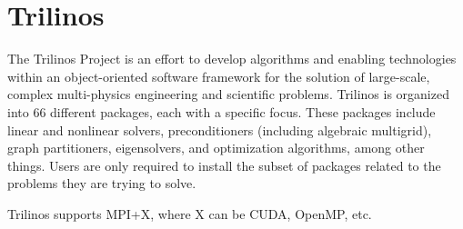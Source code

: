 \section{Trilinos}
The Trilinos Project is an effort to develop algorithms and enabling
technologies within an object-oriented software framework for the solution of
large-scale, complex multi-physics engineering and scientific problems. Trilinos
is organized into 66 different packages, each with a specific focus.  These
packages include linear and nonlinear solvers, preconditioners (including
algebraic multigrid), graph partitioners, eigensolvers, and optimization
algorithms, among other things.  Users are only required to install the subset
of packages related to the problems they are trying to solve.

Trilinos supports MPI+X, where X can be CUDA, OpenMP, etc.